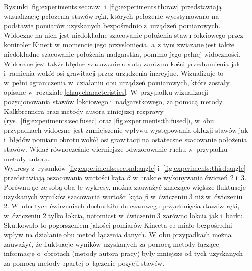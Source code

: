 Rysunki \ref{fig:experiments:sec:raw} i~\ref{fig:experiments:th:raw} przedstawiają wizualizację położenia stawów ręki, których położenie wyestymowano na podstawie pomiarów uzyskanych bezpośrednio z~urządzeń pomiarowych. Widoczne na nich jest niedokładne szacowanie położenia stawu łokciowego przez kontroler Kinect w~momencie jego przysłonięcia, a~z tym związane jest także niedokładne szacowanie położenia nadgarstka, pomimo jego pełnej widoczności. Widoczne jest także błędne szacowanie obrotu zarówno kości przedramienia jak i~ramienia wokół osi grawitacji przez urządzenia inercyjne. Wizualizuje to w~pełni ograniczenia w~działaniu obu urządzeń pomiarowych, które zostały opisane w~rozdziale \ref{chap:characteristics}. W~przypadku wizualizacji pozycjonowania stawów łokciowego i~nadgarstkowego, za pomocą metody Kalkbrennera oraz metody autora niniejszej rozprawy (rys.~\ref{fig:experiments:sec:fused} oraz \ref{fig:experiments:th:fused}), w~obu przypadkach widoczne jest zmniejszenie wpływu występowania okluzji stawów jak i~błędów pomiaru obrotu wokół osi grawitacji na ostateczne szacowanie położenia stawów. Widać równocześnie wierniejsze odwzorowanie ruchu w~przypadku metody autora.\\
				
Wykresy z~rysunków \ref{fig:experiments:second:angle} i~\ref{fig:experiments:third:angle} przedstawiają oszacowania wartości kąta $\beta$ w~trakcie wykonywania ćwiczeń 2 i~3. Porównując ze sobą oba te wykresy, można zauważyć znacząco większe fluktuacje uzyskanych wyników szacowania wartości kąta $\beta$ w~ćwiczeniu 3 niż w~ćwiczeniu 2. W~obu tych ćwiczeniach dochodziło do czasowego przysłonięcia stawów ręki, w~ćwiczeniu 2 tylko łokcia, natomiast w~ćwiczeniu 3 zarówno łokcia jak i~barku. Skutkowało to pogorszeniem jakości pomiarów Kinecta co miało bezpośredni wpływ na działanie obu metod łączenia danych. W~obu przypadkach można zauważyć, że fluktuacje wyników uzyskanych za pomocą metody łączącej informację o~obrotach (metody autora pracy) były mniejsze od tych uzyskanych za pomocą metody opartej o~łączenie pozycji stawów.
				
